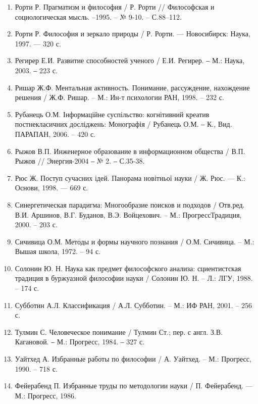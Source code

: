 \begin{enumerate}
\item Рорти Р. Прагматизм и философия / Р. Рорти // Философская и
социологическая мысль. –1995. – № 9-10. – С.88–112.

\item Рорти Р. Философия и зеркало природы / Р. Рорти. --- Новосибирск:
Наука, 1997. --- 320 с.

\item Регирер Е.И. Развитие способностей ученого / Е.И. Регирер. ‒ М.: Наука,
2003. ‒ 223 с.

\item Ришар Ж.Ф. Ментальная активность. Понимание, рассуждение,
нахождение решения / Ж.Ф. Ришар. – М.: Ин-т психологии РАН, 1998. – 232 с.

\item Рубанець О.М. Інформаційне суспільство: когнітивний креатив
постнекласичних досліджень: Монографія / Рубанець О.М. ‒ К., Вид.
ПАРАПАН, 2006. – 420 с.

\item Рыжов В.П. Инженерное образование в информационном общества
/ В.П. Рыжов // Энергия-2004 ‒ № 2. ‒ С.35-38.

\item Рюс Ж. Поступ сучасних ідей. Панорама новітньої науки / Ж. Рюс.
--- К.: Основи, 1998. --- 669 с.

\item Синергетическая парадигма: Многообразие поисков и подходов /
Отв.ред. В.И. Аршинов, В.Г. Буданов, В.Э. Войцехович. – М.: ПрогрессТрадиция, 2000. – 203 с.

\item Сичивица О.М. Методы и формы научного познания / О.М.
Сичивица. – М.: Вышая школа, 1972. – 94 с.

\item Солонин Ю. Н. Наука как предмет философского анализа:
сциентистская традиция в буржуазной философии науки / Солонин Ю. Н. – Л.:
ЛГУ, 1988. – 174 с.

\item Субботин А.Л. Классификация / А.Л. Субботин. – М.: ИФ РАН,
2001. – 256 с.

\item Тулмин С. Человеческое понимание / Тулмин Ст.; пер. с англ. З.В.
Кагановой. ‒ М.: Прогресс, 1984. ‒ 327 с.

\item Уайтхед А. Избранные работы по философии / А. Уайтхед. – М.:
Прогресс, 1990. – 718 с.

\item Фейерабенд П. Избранные труды по методологии науки / П.
Фейерабенд. --- М.: Прогресс, 1986.


\end{enumerate}
